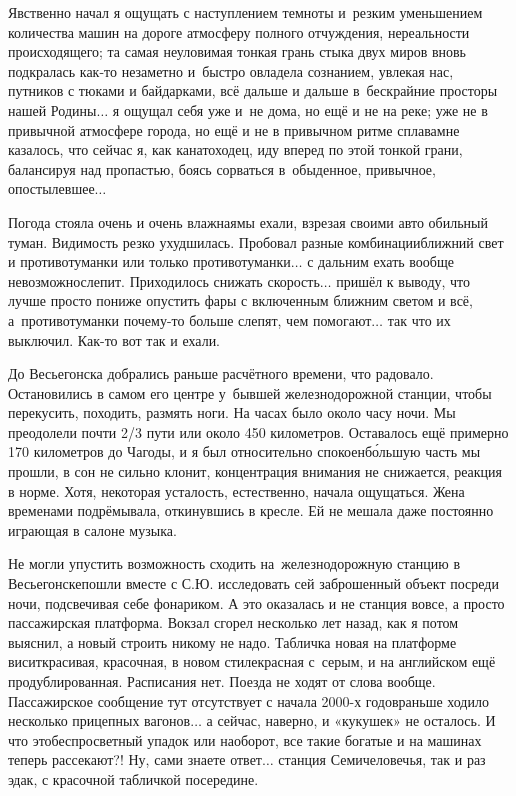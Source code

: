 Явственно начал я ощущать с наступлением темноты и~резким уменьшением количества машин на дороге атмосферу полного отчуждения, нереальности происходящего; та самая неуловимая тонкая грань стыка двух миров вновь подкралась как-то незаметно и~быстро овладела сознанием, увлекая нас, путников с тюками и байдарками, всё дальше и дальше в~бескрайние просторы нашей Родины$\ldots$ я ощущал себя уже и~не дома, но ещё и не на реке; уже не в привычной атмосфере города, но ещё и не в привычном ритме сплава\mdash мне казалось, что сейчас я, как канатоходец, иду вперед по этой тонкой грани, балансируя над пропастью, боясь сорваться в~обыденное, привычное, опостылевшее$\ldots$

Погода стояла очень и очень влажная\mdash мы ехали, взрезая своими авто обильный туман. Видимость резко ухудшилась. Пробовал разные комбинации\mdash ближний свет и противотуманки или только противотуманки$\ldots$ с дальним ехать вообще невозможно\mdash слепит. Приходилось снижать скорость$\ldots$ пришёл к выводу, что лучше просто пониже опустить фары с включенным ближним светом и всё, а~противотуманки почему-то больше слепят, чем помогают$\ldots$ так что их выключил. Как-то вот так и ехали. 

До Весьегонска добрались раньше расчётного времени, что радовало. Остановились в самом его центре у~бывшей железнодорожной станции, чтобы перекусить, походить, размять ноги. На часах было около часу ночи. Мы преодолели почти 2/3 пути или около 450 километров. Оставалось ещё примерно 170 километров до Чагоды, и я был относительно спокоен\mdash б\'{о}льшую часть мы прошли, в сон не сильно клонит, концентрация внимания не снижается, реакция в норме. Хотя, некоторая усталость, естественно, начала ощущаться. Жена временами подрёмывала, откинувшись в кресле. Ей не мешала даже постоянно играющая в салоне музыка. 

Не могли упустить возможность сходить на~железнодорожную станцию в Весьегонске\mdash пошли вместе с С.Ю. исследовать сей заброшенный объект посреди ночи, подсвечивая себе фонариком. А это оказалась и не станция вовсе, а просто пассажирская платформа. Вокзал сгорел несколько лет назад, как я потом выяснил, а новый строить никому не надо. Табличка новая на платформе висит\mdash красивая, красочная, в новом стиле\mdash красная с~серым, и на английском ещё продублированная. Расписания нет. Поезда не ходят от слова вообще. Пассажирское сообщение тут отсутствует с начала 2000-х годов\mdash раньше ходило несколько прицепных вагонов$\ldots$ а сейчас, наверно, и «кукушек» не осталось. И что это\mdash беспросветный упадок или наоборот, все такие богатые и на машинах теперь рассекают?! Ну, сами знаете ответ$\ldots$ станция Семичеловечья\cite{ГеографГлобусПропил}, так и раз эдак, с красочной табличкой посередине.

